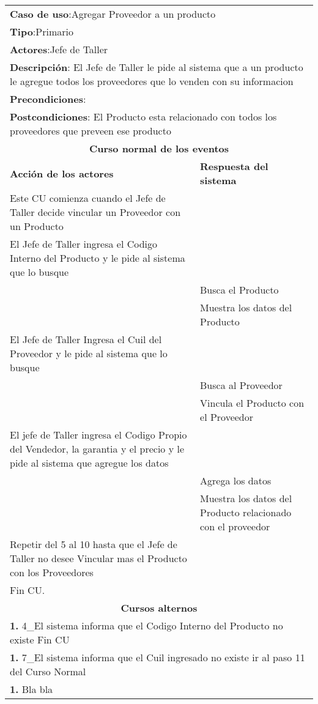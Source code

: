 \begin{longtable}{ |p{8cm}|p{8cm}| }
		\hline
		\multicolumn{2}{|p{16cm}|}{\textbf{Caso de uso}:Agregar Proveedor a un producto }\\
		\multicolumn{2}{|p{16cm}|}{\textbf{Tipo}:Primario }\\
		\multicolumn{2}{|p{16cm}|}{\textbf{Actores}:Jefe de Taller }\\
		\multicolumn{2}{|p{16cm}|}{\textbf{Descripción}: El Jefe de Taller le pide al sistema que a un producto le agregue todos los proveedores que lo venden con su informacion }\\
		\multicolumn{2}{|p{16cm}|}{\textbf{Precondiciones}: }\\
		\multicolumn{2}{|p{16cm}|}{\textbf{Postcondiciones}: El Producto esta relacionado con todos los proveedores que preveen ese producto  }\\
		\hline
		\multicolumn{2}{|c|}{\textbf{Curso normal de los eventos}}\\
		\hline
		\textbf{Acción de los actores} & \textbf{Respuesta del sistema}\\
		\hline
			\inc Este CU comienza cuando el Jefe de Taller decide vincular un Proveedor con un Producto & \\
			\hline
			\inc El Jefe de Taller ingresa el Codigo Interno del Producto y le pide al sistema que lo busque &   \\
			\hline
			& \inc Busca el Producto \\
			\hline
			& \inc Muestra los datos del Producto \\
			\hline
			\inc El Jefe de Taller Ingresa el Cuil del Proveedor y le pide al sistema que lo busque &  \\
			\hline
			& \inc Busca al Proveedor \\
			\hline
			& \inc Vincula el Producto con el Proveedor \\
			\hline
			\inc El jefe de Taller ingresa el Codigo Propio del Vendedor, la garantia y el precio y le pide al sistema que agregue los datos &   \\
			\hline
			& \inc Agrega los datos  \\
			\hline
			& \inc Muestra los datos del Producto relacionado con el proveedor  \\
			\hline
			\inc Repetir del 5 al 10 hasta que el Jefe de Taller no desee Vincular mas el Producto con los Proveedores &   \\
			\hline
			\inc Fin CU. & \\
		\hline
		\multicolumn{2}{|c|}{\textbf{Cursos alternos}}\\
		\hline
		\multicolumn{2}{|p{16cm}|}{\textbf{1. }4_El sistema informa que el Codigo Interno del Producto no existe Fin CU }\\
		\hline
		\multicolumn{2}{|p{16cm}|}{\textbf{1. }7_El sistema informa que el Cuil ingresado no existe ir al paso 11 del Curso Normal }\\
		\hline
		\multicolumn{2}{|p{16cm}|}{\textbf{1. }Bla bla }\\
		\hline	
	\end{longtable}